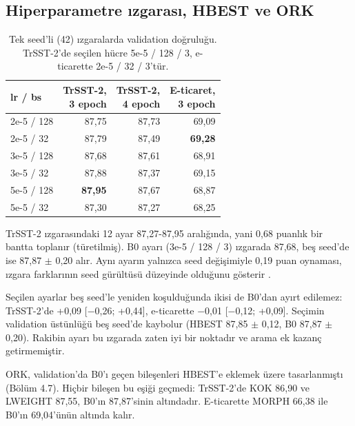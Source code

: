 \documentclass[11pt]{article}
\begin{document}
\subsection{Hiperparametre ızgarası, HBEST ve ORK}

\begin{table}[!htbp]
\centering
\small
\setlength{\tabcolsep}{4pt}
\begin{tabular}{lrrr}
\toprule
lr / bs & \makecell[r]{TrSST-2, \\ 3 epoch} & \makecell[r]{TrSST-2, \\ 4 epoch} & \makecell[r]{E-ticaret, \\ 3 epoch} \\
\midrule
2e-5 / 128 & \mbox{87,75} & \mbox{87,73} & \mbox{69,09} \\
2e-5 / 32 & \mbox{87,79} & \mbox{87,49} & \mbox{\textbf{69,28}} \\
3e-5 / 128 & \mbox{87,68} & \mbox{87,61} & \mbox{68,91} \\
3e-5 / 32 & \mbox{87,88} & \mbox{87,37} & \mbox{69,15} \\
5e-5 / 128 & \mbox{\textbf{87,95}} & \mbox{87,67} & \mbox{68,87} \\
5e-5 / 32 & \mbox{87,30} & \mbox{87,27} & \mbox{68,25} \\
\bottomrule
\end{tabular}
\caption{Tek seed'li (42) ızgaralarda validation doğruluğu. TrSST-2'de seçilen hücre 5e-5 / 128 / 3, e-ticarette 2e-5 / 32 / 3'tür.}
\label{tab:14}
\end{table}

TrSST-2 ızgarasındaki 12 ayar 87,27-87,95 aralığında, yani 0,68 puanlık bir bantta toplanır (türetilmiş). B0 ayarı (3e-5 / 128 / 3) ızgarada 87,68, beş seed'de ise 87,87 $\pm$ 0,20 alır. Aynı ayarın yalnızca seed değişimiyle 0,19 puan oynaması, ızgara farklarının seed gürültüsü düzeyinde olduğunu gösterir \citep{dodge2020}.

Seçilen ayarlar beş seed'le yeniden koşulduğunda ikisi de B0'dan ayırt edilemez: TrSST-2'de +0,09 [$-$0,26; +0,44], e-ticarette $-$0,01 [$-$0,12; +0,09]. Seçimin validation üstünlüğü beş seed'de kaybolur (HBEST 87,85 $\pm$ 0,12, B0 87,87 $\pm$ 0,20). Rakibin ayarı bu ızgarada zaten iyi bir noktadır ve arama ek kazanç getirmemiştir.

ORK, validation'da B0'ı geçen bileşenleri HBEST'e eklemek üzere tasarlanmıştı (Bölüm 4.7). Hiçbir bileşen bu eşiği geçmedi: TrSST-2'de KOK 86,90 ve LWEIGHT 87,55, B0'ın 87,87'sinin altındadır. E-ticarette MORPH 66,38 ile B0'ın 69,04'ünün altında kalır.
\end{document}
